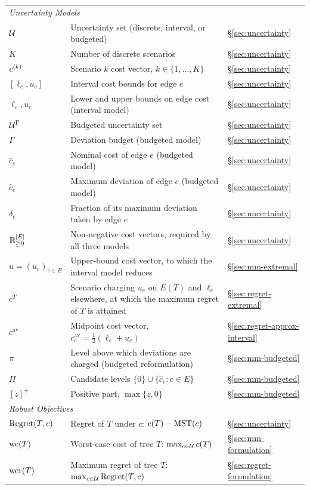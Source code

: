 \begin{longtable}{@{}l>{\raggedright\arraybackslash}p{}l@{}}
\multicolumn{3}{l}{\textit{Uncertainty Models}} \\
$\mathcal{U}$ & Uncertainty set (discrete, interval, or budgeted) & \S\ref{sec:uncertainty} \\
$K$ & Number of discrete scenarios & \S\ref{sec:uncertainty} \\
$c^{(k)}$ & Scenario $k$ cost vector, $k \in \{1, \ldots, K\}$ & \S\ref{sec:uncertainty} \\
$[\ell_e, u_e]$ & Interval cost bounds for edge $e$ & \S\ref{sec:uncertainty} \\
$\ell_e, u_e$ & Lower and upper bounds on edge cost (interval model) & \S\ref{sec:uncertainty} \\
$\mathcal{U}^{\Gamma}$ & Budgeted uncertainty set & \S\ref{sec:uncertainty} \\
$\Gamma$ & Deviation budget (budgeted model) & \S\ref{sec:uncertainty} \\
$\bar{c}_e$ & Nominal cost of edge $e$ (budgeted model) & \S\ref{sec:uncertainty} \\
$\hat{c}_e$ & Maximum deviation of edge $e$ (budgeted model) & \S\ref{sec:uncertainty} \\
$\delta_e$ & Fraction of its maximum deviation taken by edge $e$ & \S\ref{sec:uncertainty} \\
$\mathbb{R}^{|E|}_{\geq 0}$ & Non-negative cost vectors, required by all three models & \S\ref{sec:uncertainty} \\
$u = (u_e)_{e \in E}$ & Upper-bound cost vector, to which the interval model reduces & \S\ref{sec:mm-extremal} \\
$c^{T}$ & Scenario charging $u_e$ on $E(T)$ and $\ell_e$ elsewhere, at which the maximum regret of $T$ is attained & \S\ref{sec:regret-extremal} \\
$c^{\mathrm{av}}$ & Midpoint cost vector, $c^{\mathrm{av}}_e = \tfrac{1}{2}(\ell_e + u_e)$ & \S\ref{sec:regret-approx-interval} \\
$\pi$ & Level above which deviations are charged (budgeted reformulation) & \S\ref{sec:mm-budgeted} \\
$\Pi$ & Candidate levels $\{0\} \cup \{\hat{c}_e : e \in E\}$ & \S\ref{sec:mm-budgeted} \\
$[z]^{+}$ & Positive part, $\max\{z, 0\}$ & \S\ref{sec:mm-budgeted} \\
\midrule

\multicolumn{3}{l}{\textit{Robust Objectives}} \\
$\operatorname{Regret}(T,c)$ & Regret of $T$ under $c$: $c(T) - \mathrm{MST}(c)$ & \S\ref{sec:uncertainty} \\
$\mathrm{wc}(T)$ & Worst-case cost of tree $T$: $\max_{c \in \mathcal{U}} c(T)$ & \S\ref{sec:mm-formulation} \\
$\mathrm{wcr}(T)$ & Maximum regret of tree $T$: $\max_{c \in \mathcal{U}} \operatorname{Regret}(T,c)$ & \S\ref{sec:regret-formulation} \\
\midrule


\end{longtable}

